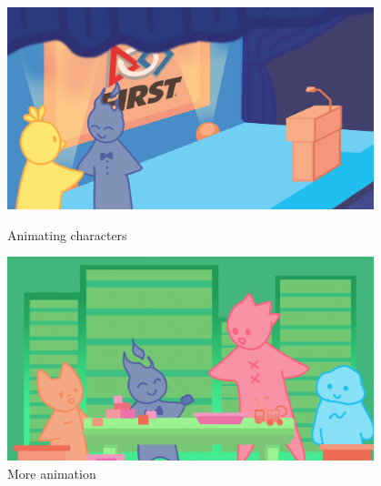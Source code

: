 \begin{figure}[ht]
\centering
\begin{minipage}[b]{.48\textwidth}
  \centering
  \includegraphics[width=0.95\textwidth]{Meetings/January/01-30-22/1.30.22 - Falon Jones.png}
  \caption{Animating characters}
  \label{fig:013022_1}
\end{minipage}%
\hfill%
\begin{minipage}[b]{.48\textwidth}
  \centering
  \includegraphics[width=0.95\textwidth]{Meetings/January/01-30-22/1_30_22 - Falon Jones.png}
  \caption{More animation}
  \label{fig:013022_2}
\end{minipage}
\end{figure}


